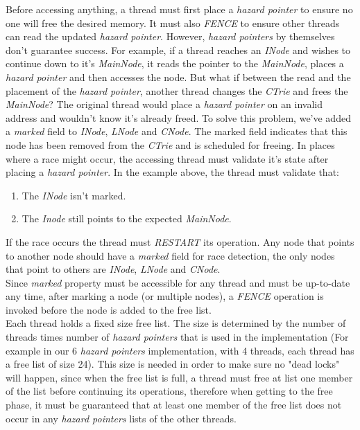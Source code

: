 \documentclass[conference]{IEEEtran}
\begin{document}
	Before accessing anything, a thread must first place a \textit{hazard pointer} to ensure no one will free the desired memory. It must also \textit{FENCE} to ensure other threads can read the updated \textit{hazard pointer}. However, \textit{hazard pointers} by themselves don't guarantee success. For example, if a thread reaches an \textit{INode} and wishes to continue down to it's \textit{MainNode}, it reads the pointer to the \textit{MainNode}, places a \textit{hazard pointer} and then accesses the node. But what if between the read and the placement of the \textit{hazard pointer}, another thread changes the \textit{CTrie} and frees the \textit{MainNode}? The original thread would place a \textit{hazard pointer} on an invalid address and wouldn't know it's already freed. To solve this problem, we've added a \textit{marked} field to \textit{INode}, \textit{LNode} and \textit{CNode}. The marked field indicates that this node has been removed from the \textit{CTrie} and is scheduled for freeing. In places where a race might occur, the accessing thread must validate it's state after placing a \textit{hazard pointer}. In the example above, the thread must validate that:
	\begin{enumerate}
		\item The \textit{INode} isn't marked.
		\item The \textit{Inode} still points to the expected \textit{MainNode}.		
	\end{enumerate}
	If the race occurs the thread must \textit{RESTART} its operation. Any node that points to another node should have a \textit{marked} field for race detection, the only nodes that point to others are \textit{INode}, \textit{LNode} and \textit{CNode}. \\
	Since \textit{marked} property must be accessible for any thread and must be up-to-date any time, after marking a node (or multiple nodes), a \textit{FENCE} operation is invoked before the node is added to the free list. \\
	Each thread holds a fixed size free list. The size is determined by the number of threads times number of \textit{hazard pointers} that is used in the implementation (For example in our 6 \textit{hazard pointers} implementation, with 4 threads, each thread has a free list of size 24). This size is needed in order to make sure no "dead locks" will happen, since when the free list is full, a thread must free at list one member of the list before continuing its operations, therefore when getting to the free phase, it must be guaranteed that at least one member of the free list does not occur in any \textit{hazard pointers} lists of the other threads.
	
\end{document}
